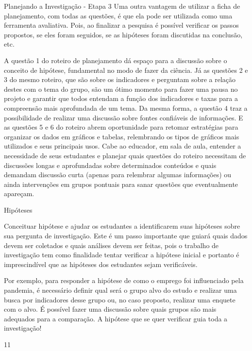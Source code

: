 \begin{paginatexto}{Planejando a Investigação - Etapa 3}
Uma outra vantagem de utilizar a ficha de planejamento, com todas as questões, é que ela pode ser utilizada como uma ferramenta avaliativa. Pois, ao finalizar a pesquisa é possível verificar os passos propostos, se eles foram seguidos, se as hipóteses foram discutidas na conclusão, etc. 

A questão 1 do roteiro de planejamento dá espaço para a discussão sobre o conceito de hipótese, fundamental no modo de fazer da ciência. Já as questões 2 e 3 do mesmo roteiro, que são sobre os indicadores e perguntam sobre a relação destes com o tema do grupo, são um ótimo momento para fazer uma pausa no projeto e garantir que todos entendam a função dos indicadores e taxas para a compreensão mais aprofundada de um tema. Da mesma forma, a questão 4 traz a possibilidade de realizar uma discussão sobre fontes confiáveis de informações. E as questões 5 e 6 do roteiro abrem oportunidade para retomar estratégias para organizar os dados em gráficos e tabelas, relembrando os tipos de gráficos mais utilizados e seus principais usos. Cabe ao educador, em sala de aula, entender a necessidade de seus estudantes e planejar quais questões do roteiro necessitam de discussões longas e aprofundadas sobre determinados conteúdos e quais demandam discussão curta (apenas para relembrar algumas informações) ou ainda intervenções em grupos pontuais para sanar questões que eventualmente apareçam.

\end{paginatexto}

\def\currentcolor{session4}


\begin{objectives}{Hipóteses}
{
Conceituar hipótese e ajudar os estudantes a identificarem suas hipóteses sobre sua pergunta de investigação. Este é um passo importante que guiará quais dados devem ser coletados e quais análises devem ser feitas, pois o trabalho de investigação tem como finalidade tentar verificar a hipótese inicial e portanto é imprescindível que as hipóteses dos estudantes sejam verificáveis. 

Por exemplo, para responder a hipótese de como o emprego foi influenciado pela pandemia, é necessário definir qual será o grupo alvo do estudo e realizar uma busca por indicadores desse grupo ou, no caso proposto, realizar uma enquete com o alvo. É possível fazer uma discussão sobre quais grupos são mais adequados para a comparação. A hipótese que se quer verificar guia toda a investigação!
}{1}{1}
\end{objectives}



